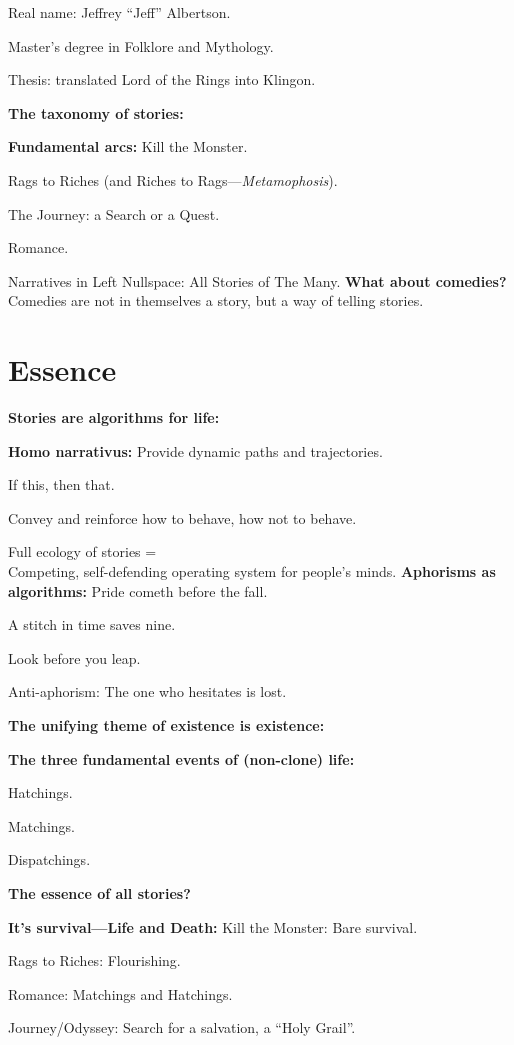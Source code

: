       
        Real name: Jeffrey ``Jeff'' Albertson.
      
        Master's degree in Folklore and Mythology.
      
        Thesis: translated Lord of the Rings into Klingon.
  
  \textbf{The taxonomy of stories:}

  \textbf{Fundamental arcs:}
      Kill the Monster.
    
      Rags to Riches (and Riches to Rags---\textit{Metamophosis}).
    
      The Journey: a Search or a Quest.
    
      Romance.
    
      Narratives in Left Nullspace: All Stories of The Many.
  \textbf{What about comedies?}
      Comedies are not in themselves a story, but a way
      of telling stories.
  
\section{Essence}
  \textbf{Stories are algorithms for life:}

  \textbf{Homo narrativus:}
      Provide dynamic paths and trajectories.
    
      If this, then that.
    
      Convey and reinforce how to behave, how not to behave.
    
      Full ecology of stories 
      = \\
      Competing, self-defending operating system
      for people's minds.
  \textbf{Aphorisms as algorithms:}
      Pride cometh before the fall.
    
      A stitch in time saves nine.
    
      Look before you leap.
    
      Anti-aphorism: The one who hesitates is lost.
  
  \small
  
  \textbf{The unifying theme of existence is existence:}

  \textbf{The three fundamental events of (non-clone) life:}
      
        Hatchings.
      
        Matchings.
      
        Dispatchings.
    
  \textbf{The essence of all stories?}

  \textbf{It's survival---Life and Death:}
      Kill the Monster: Bare survival.
    
      Rags to Riches: Flourishing.
    
      Romance: Matchings and Hatchings.
    
      Journey/Odyssey: Search for a salvation, a ``Holy Grail''.
  


